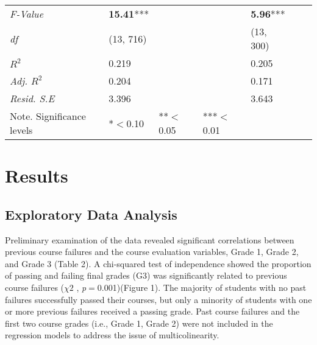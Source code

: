 \documentclass[sigconf]{acmart}
\begin{document}
\begin{table*}[ht]
\begin{tabular}{lllllll}
    \textit{F-Value}    & \textbf{15.41}***  &       &        & \textbf{5.96}***    &       &       \\
    \textit{df}         &   (13, 716)        &       &        &      (13, 300)      &       &       \\
    \textit{$R^2$}      &      0.219         &       &        &         0.205       &       &       \\ 
    \textit{Adj. $R^2$} &      0.204         &       &        &         0.171       &       &       \\
    \textit{Resid. S.E} &      3.396         &       &        &         3.643       &       &       \\
    \bottomrule
    Note. Significance levels & *$<$0.10      & **$<$0.05  & ***$<$0.01 & & &
  \end{tabular}
\end{table*}


\section{Results}

\subsection{Exploratory Data Analysis}

Preliminary examination of the data revealed significant correlations 
between previous course failures and the course evaluation variables,
Grade 1, Grade 2, and Grade 3 (Table 2). A chi-squared test of independence 
showed the proportion of passing and failing final grades (G3) was 
significantly related to previous course failures ($\chi 2$ ,
\textit{p}$=$0.001)(Figure 1). The majority of students with no past failures 
successfully passed their courses, but only a minority of students with one
or more previous failures received a passing grade. Past course failures 
and the first two course grades (i.e., Grade 1, Grade 2) were not included 
in the regression models to address the issue of multicolinearity.

\end{document}
